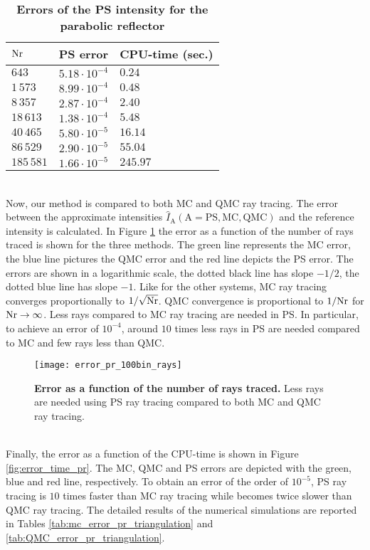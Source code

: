 \begin{table}[t] \label{tab:table_pr_triangulation}
\centering
\caption{\bf Errors of the PS intensity for the parabolic reflector}
\begin{tabular}{lll}
 \hline   $\textrm{Nr}$ & PS error & CPU-time (sec.) \\
  \hline 
 $643$        & $5.18\cdot10^{-4}$ & $0.24$\\
 $1\,573$       & $8.99\cdot 10^{-4}$ & $0.48$\\
 $8\,357$     & $2.87\cdot 10^{-4}$ & $2.40$ \\
 $18\,613$     & $1.38\cdot 10^{-4}$ & $5.48$\\
 $40\,465$   & $5.80\cdot 10^{-5}$ & $16.14$\\
 $86\,529$    & $2.90\cdot 10^{-5}$ & $55.04$\\
 $185\,581$   & $1.66\cdot 10^{-5}$ & $245.97$\\
 \hline
 \end{tabular}
 \end{table}
\\ \indent 
Now, our method is compared to both MC and QMC ray tracing. 
The error between the approximate intensities $\hat{I}_{\textrm{A}}(\textrm{A}=\textrm{PS}, \textrm{MC}, \textrm{QMC})$ and the reference intensity is calculated. In Figure \ref{fig:error_rays_pr} the error as a function of the number of rays traced is shown for the three methods.
The green line represents the MC error, the blue line pictures the QMC error and the red line depicts the PS error. The errors are shown in a logarithmic scale, the dotted black line has slope $-1/2$, the dotted blue line has slope $-1$. Like for the other systems, MC ray tracing converges proportionally to $1/\sqrt{\textrm{Nr}}$. QMC convergence is proportional to $1/\textrm{Nr}$ for $\textrm{Nr} \rightarrow \infty$. Less rays compared to MC ray tracing are needed in PS. In particular, to achieve an error of $10^{-4}$, around $10$ times less rays in PS are needed compared to MC and few rays less than QMC.
\begin{figure}[t]
  \center
  \texttt{[image: error\_pr\_100bin\_rays]}
  \caption{\textbf{Error as a function of the number of rays traced.} Less rays are needed using PS ray tracing compared to both MC and QMC ray tracing.}
  \label{fig:error_rays_pr}
\end{figure} 
\\ \indent
Finally, the error as a function of the CPU-time is shown in Figure \ref{fig:error_time_pr}. The MC, QMC and PS errors are depicted with the green, blue and red line, respectively. To obtain an error of the order of $10^{-5}$, PS ray tracing is $10$ times faster than MC ray tracing while becomes twice slower than QMC ray tracing. The detailed results of the numerical simulations are reported in Tables \ref{tab:mc_error_pr_triangulation} and \ref{tab:QMC_error_pr_triangulation}.
